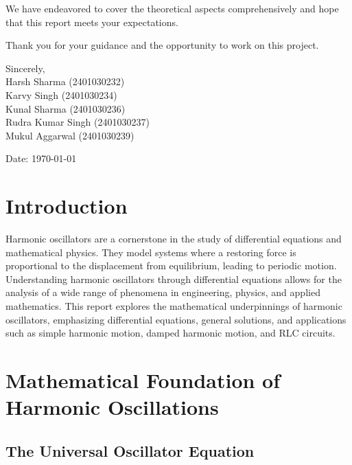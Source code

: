 \documentclass[12pt,a4paper]{article}
\begin{document}
\vspace{1em}

\noindent
We have endeavored to cover the theoretical aspects comprehensively and hope that this report meets your expectations.

\vspace{1em}

\noindent
Thank you for your guidance and the opportunity to work on this project.

\vspace{2em}

\noindent
Sincerely, \\[2em]

\noindent
Harsh Sharma (2401030232)\\
Karvy Singh (2401030234)\\
Kunal Sharma (2401030236)\\
Rudra Kumar Singh (2401030237)\\
Mukul Aggarwal (2401030239)

\vspace{2cm}

\noindent
Date: \today

\newpage

\tableofcontents

\newpage

\section{Introduction}

Harmonic oscillators are a cornerstone in the study of differential equations and mathematical physics. They model systems where a restoring force is proportional to the displacement from equilibrium, leading to periodic motion. Understanding harmonic oscillators through differential equations allows for the analysis of a wide range of phenomena in engineering, physics, and applied mathematics. This report explores the mathematical underpinnings of harmonic oscillators, emphasizing differential equations, general solutions, and applications such as simple harmonic motion, damped harmonic motion, and RLC circuits.

\section{Mathematical Foundation of Harmonic Oscillations}

\subsection{The Universal Oscillator Equation}
\end{document}
